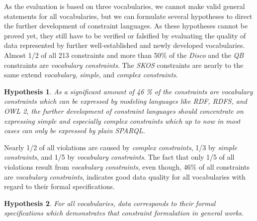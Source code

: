 \documentclass{llncs}
\newcommand{\tb}[1]{\todo[size=\small, color=green!40]{\textbf{Thomas:} #1}}
\newtheorem{hyp}{Hypothesis}
\begin{document}
{{As the evaluation is based on three vocabularies, 
we cannot make valid general statements for all vocabularies,
but we can formulate several hypotheses to direct the further development of constraint languages.
As these hypotheses cannot be proved yet, 
they still have to be verified or falsified
by evaluating the quality of data represented by further well-established and newly developed vocabularies.
Almost 1/2 of all 213 constraints and more than 50\% of the \emph{Disco} and the \emph{QB} constraints are \emph{vocabulary constraints}.
The \emph{SKOS} constraints are nearly to the same extend \emph{vocabulary}, \emph{simple}, and \emph{complex constraints}. 
\begin{hyp}
As a significant amount of 46 \% of the constraints are vocabulary constraints which can be expressed by modeling languages like RDF, RDFS, and OWL 2,
the further development of constraint languages should concentrate on expressing simple and especially complex constraints which up to now in most cases can only be expressed by plain SPARQL.   
\end{hyp} 

Nearly 1/2 of all violations are caused by \emph{complex constraints}, 1/3 by \emph{simple constraints}, and 1/5 by \emph{vocabulary constraints}.
The fact that only 1/5 of all violations result from \emph{vocabulary constraints}, 
even though, 46\% of all constraints are \emph{vocabulary constraints},
indicates good data quality for all vocabularies with regard to their formal specifications.
\begin{hyp}
For all vocabularies, data corresponds to their formal specifications which demonstrates that constraint formulation in general works. 
\end{hyp}

}}
\end{document}

